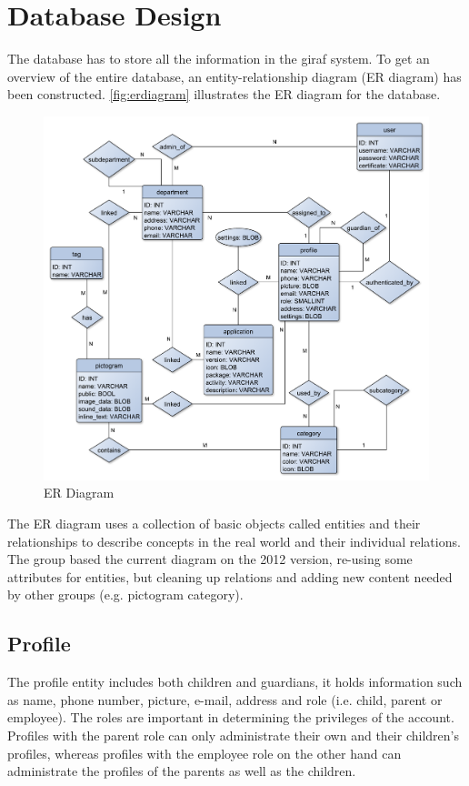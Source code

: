 \section{Database Design}
The database has to store all the information in the \ac{giraf} system.
To get an overview of the entire database, an entity-relationship diagram (ER diagram) has been constructed. \autoref{fig:erdiagram} illustrates the ER diagram for the database.

\begin{figure}[hptb]
\begin{center}
\includegraphics[width=\textwidth]{img/ER_diagram3.pdf}
\caption{ER Diagram}
\label{fig:erdiagram}
\end{center}
\end{figure}

The ER diagram uses a collection of basic objects called entities and their relationships to describe concepts in the real world and their individual relations. The group based the current diagram on the 2012 version, re-using some attributes for entities, but cleaning up relations and adding new content needed by other groups (e.g. pictogram category). 

\subsection{Profile}
The profile entity includes both children and guardians, it holds information such as name, phone number, picture, e-mail, address and role (i.e. child, parent or employee). The roles are important in determining the privileges of the account. Profiles with the parent role can only administrate their own and their children's profiles, whereas profiles with the employee role on the other hand can administrate the profiles of the parents as well as the children. 

